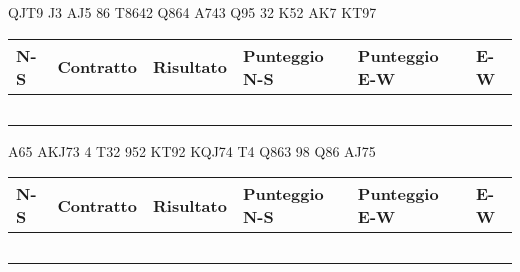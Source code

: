 \documentclass[a4paper,italian,12pt]{article}
\begin{document}
\medskip

\begin{tcolorbox}
\begin{minipage}{.3\textwidth}
\newgame
{}
     {QJT9} {J3} {AJ5}
     {86} {T8642} {Q864}
     {A743} {Q95} {32}
     {K52} {AK7} {KT97}



\hspace{-.2cm}\showAll
\end{minipage}
\begin{minipage}{.7\textwidth}

\renewcommand{\arraystretch}{2}
\begin{tabular}{|l|l|l|l|l|l|}
\hline
N-S & Contratto\hspace{1.5cm} & Risultato& Punteggio N-S & Punteggio E-W & E-W\\\hline
  &&&&&\\\hline
   &&&&&\\\hline
    &&&&&\\\hline
     &&&&&\\\hline
          &&&&&\\\hline
\end{tabular}
\end{minipage}
\end{tcolorbox}

\medskip

\begin{tcolorbox}
\begin{minipage}{.3\textwidth}
\newgame
{}
     {A65} {AKJ73} {4}
     {T32} {952} {KT92}
     {KQJ74} {T4} {Q863}
     {98} {Q86} {AJ75}


    \hspace{-.2cm}\showAll
\end{minipage}
\begin{minipage}{.7\textwidth}

\renewcommand{\arraystretch}{2}
\begin{tabular}{|l|l|l|l|l|l|}
\hline
N-S & Contratto\hspace{1.5cm} & Risultato& Punteggio N-S & Punteggio E-W & E-W\\\hline
  &&&&&\\\hline
   &&&&&\\\hline
    &&&&&\\\hline
     &&&&&\\\hline
          &&&&&\\\hline
\end{tabular}
\end{minipage}
\end{tcolorbox}
\newpage
\end{document}
